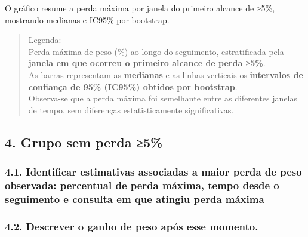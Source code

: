 \documentclass[
]{article}
\begin{document}
O gráfico resume a perda máxima por janela do primeiro alcance de ≥5\%,
mostrando medianas e IC95\% por bootstrap.

\begin{quote}
Legenda:\\
Perda máxima de peso (\%) ao longo do seguimento, estratificada pela
\textbf{janela em que ocorreu o primeiro alcance de perda ≥5\%}.\\
As barras representam as \textbf{medianas} e as linhas verticais os
\textbf{intervalos de confiança de 95\% (IC95\%) obtidos por
bootstrap}.\\
Observa-se que a perda máxima foi semelhante entre as diferentes janelas
de tempo, sem diferenças estatisticamente significativas.\\
\end{quote}

\subsection{4. Grupo sem perda ≥5\%}\label{grupo-sem-perda-5}

\subsubsection{4.1. Identificar estimativas associadas a maior perda de
peso observada: percentual de perda máxima, tempo desde o seguimento e
consulta em que atingiu perda
máxima}\label{identificar-estimativas-associadas-a-maior-perda-de-peso-observada-percentual-de-perda-muxe1xima-tempo-desde-o-seguimento-e-consulta-em-que-atingiu-perda-muxe1xima}

\subsubsection{4.2. Descrever o ganho de peso após esse
momento.}\label{descrever-o-ganho-de-peso-apuxf3s-esse-momento.}
\end{document}
